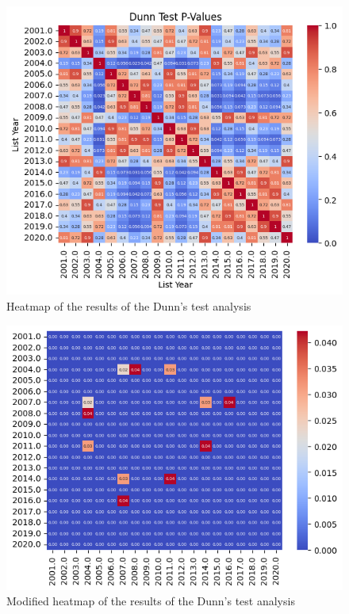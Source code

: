 \documentclass[12pt]{article}
\begin{document}
\begin{figure}[!t]
  \centering
  \includegraphics[width=\textwidth]{dunnheatmap.png}
  \caption{Heatmap of the results of the Dunn's test analysis}
  \label{fig:dunnheatmap}
\end{figure}

\begin{figure}[!t]
  \centering
  \includegraphics[width=\textwidth]{dunnheatmapmodif.png}
  \caption{Modified heatmap of the results of the Dunn's test analysis}
  \label{fig:dunnheatmapmodif}
\end{figure}
\end{document}
